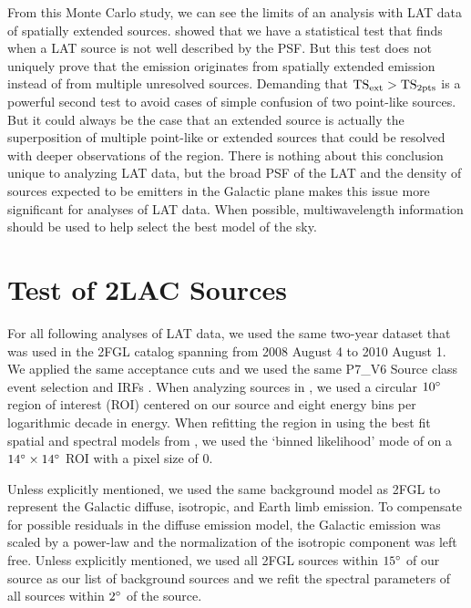 From this Monte Carlo study, we can see the limits of an analysis with
LAT data of spatially extended sources.  
showed that we have a statistical test that finds when a LAT source is
not well described by the PSF.  But this test does not uniquely prove
that the emission originates from spatially extended emission instead
of from multiple unresolved sources.  Demanding that $\mathrm{TS}_\mathrm{ext}>\mathrm{TS}_{\mathrm{2pts}}$
is a powerful second test to avoid cases of simple confusion of two
point-like sources. But it could always be the case that an extended
source is actually the superposition of multiple point-like or
extended sources that could be resolved with deeper observations of the
region.  There is nothing about this conclusion unique to analyzing LAT data,
but the broad PSF of the LAT and the density of sources expected to be
\gev emitters in the Galactic plane makes this issue more significant
for analyses of LAT data.  When possible, multiwavelength information should be
used to help select the best model of the sky.


\section{Test of 2LAC Sources}


For all following analyses of LAT data, we used the same two-year dataset
that was used in the 2FGL catalog spanning from 2008 August 4 to 2010 August 1. We
applied the same acceptance cuts and we used the same P7\_V6 Source class
event selection and IRFs \citep{ackermann_2012a_fermi-large}.  
When analyzing sources in \pointlike, we used a circular $10^\circ$ region of
interest (ROI) centered on our source and eight energy bins per
logarithmic decade in energy.
When refitting the region in \gtlike using the best fit spatial and
spectral models from \pointlike, we used the `binned likelihood' mode of
\gtlike on a $14^\circ\times14^\circ$ ROI with a pixel size of 0.

Unless explicitly
mentioned, we used the same background model as 2FGL to represent the
Galactic diffuse, isotropic, and Earth limb emission.  To compensate for
possible residuals in the diffuse emission model, the Galactic emission
was scaled by a power-law and the normalization
of the isotropic component
was left free.  
Unless explicitly mentioned,
we used all 2FGL sources within $15^\circ$ of our source as our list
of background sources and we refit the spectral parameters of all sources
within $2^\circ$ of the source.



